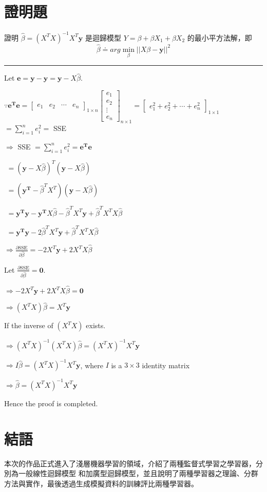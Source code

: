 \section{證明題}
證明 $\hat{\beta} = (X^T X)^{-1}X^T \mathbf{y}$ 是迴歸模型 $Y = \beta + \beta X_1 + \beta X_2$ 的最小平方法解，即 \[\hat{\beta} \doteq arg \mathop{\min}\limits_{\beta} ||X \beta - \mathbf{y}||^2\]

\rule{15cm}{0.5mm}

Let $\mathbf{e} = \mathbf{y} - \hat{\mathbf{y}} = \mathbf{y} - X \hat{\beta}$.

$\because \mathbf{e^T e} = \begin{bmatrix}
e_1 & e_2  & \cdots & e_n
\end{bmatrix}_{1 \times n} \begin{bmatrix}
e_1    \\
e_2    \\
\vdots \\
e_n      
\end{bmatrix}_{n \times 1} = \begin{bmatrix}
e_1^2 + e_2^2 + \cdots + e_n^2
\end{bmatrix}_{1 \times 1}$ $\displaystyle = \sum_{i = 1}^n e_i^2 = $ SSE

$\Rightarrow$ SSE $\displaystyle = \sum_{i = 1}^n e_i^2 = \mathbf{e^T e}$

\quad \quad \quad \,\,$= (\mathbf{y} - X \hat{\beta})^T (\mathbf{y} - X \hat{\beta})$

\quad \quad \quad \,\,$= (\mathbf{y^T} - \hat{\beta}^T X^T) (\mathbf{y} - X \hat{\beta})$

\quad \quad \quad \,\,$= \mathbf{y^T}\mathbf{y} - \mathbf{y^T}X\hat{\beta} - \hat{\beta}^T X^T \mathbf{y} + \hat{\beta}^T X^T X \hat{\beta}$

\quad \quad \quad \,\,$= \mathbf{y^T}\mathbf{y} - 2\hat{\beta}^T X^T \mathbf{y} + \hat{\beta}^T X^T X \hat{\beta}$

$\displaystyle \Rightarrow \frac{\partial \text{SSE}}{\partial \hat{\beta}} = -2 X^T \mathbf{y} + 2 X^T X \hat{\beta}$

Let $\displaystyle \frac{\partial \text{SSE}}{\partial \hat{\beta}} = \mathbf{0}$.

$\Rightarrow -2 X^T \mathbf{y} + 2 X^T X \hat{\beta} = \mathbf{0}$

$\Rightarrow (X^T X)\hat{\beta} = X^T \mathbf{y}$

If the inverse of $(X^T X)$ exists.

$\Rightarrow (X^T X)^{-1}(X^T X)\hat{\beta} = (X^T X)^{-1}X^T \mathbf{y}$

$\Rightarrow I\hat{\beta} = (X^T X)^{-1}X^T \mathbf{y}$, where $I$ is a $3 \times 3$  identity matrix

$\Rightarrow \hat{\beta} = (X^T X)^{-1}X^T \mathbf{y}$

Hence the proof is completed.

\section{結語}
本次的作品正式進入了淺層機器學習的領域，介紹了兩種監督式學習之學習器，分別為一般線性迴歸模型
和加廣型迴歸模型，並且說明了兩種學習器之理論、分群方法與實作，最後透過生成模擬資料的訓練評比兩種學習器。
%